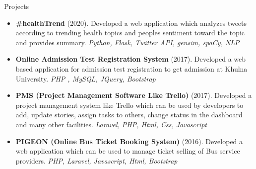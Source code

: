 \documentclass[]{mcdowellcv}
\begin{document}
	
	\begin{cvsection}{Projects}
		\begin{cvsubsection}{}{}{}
			\begin{itemize}
			 
			 \item \textbf{#healthTrend} (2020). Developed a web application which analyzes tweets according to trending health topics and peoples sentiment toward the topic and provides summary. \emph{Python, Flask, Twitter API, gensim, spaCy, NLP}
			
			  \item \textbf{Online Admission Test Registration System} (2017). 
				Developed a web based application for admission test registration to get admission at Khulna University. \emph{PHP , MySQL, JQuery, Bootstrap}
				
				\item \textbf{PMS (Project Management Software Like Trello) } (2017). Developed a project management system like Trello which can be used by developers to add, update stories, assign tasks to others, change status in the dashboard and many other facilities.  \emph{Laravel, PHP, Html, Css, Javascript}
				
				\item \textbf{PIGEON (Online Bus Ticket Booking System)} (2016). Developed a web application which can be used to manage ticket selling of Bus service providers. \emph{PHP, Laravel, Javascript, Html, Bootstrap}
				
				
			\end{itemize}
		\end{cvsubsection}
	\end{cvsection}
	
	
		
\end{document}
